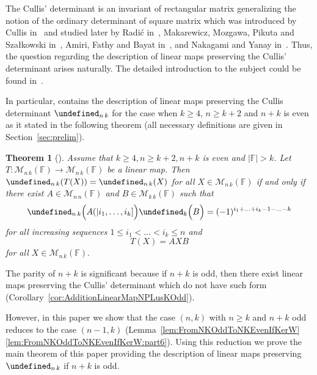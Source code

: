 \documentclass{elsarticle}
\def\F{{\mathbb F}}
\def\M{{\mathcal M}}
\let\det\undefined
\DeclareMathOperator{\det}{det}
\theoremstyle{plain}
\newtheorem{theorem}{Theorem}[section]
\theoremstyle{definition}
\numberwithin{equation}{section}
\begin{document}
The Cullis' determinant is an invariant of rectangular matrix generalizing the notion of the ordinary determinant of square matrix which was introduced by Cullis in~\cite{cullis1913} and studied later by Radi\'{c} in~\cite{radic1966,radic2005,radic1991,radic2008}, Makarewicz, Mozgawa, Pikuta and Sza\l{}kowski in~\cite{makarewicz2014,makarewicz2016,makarewicz2020}, Amiri, Fathy and Bayat in~\cite{amiri2010}, and Nakagami and Yanay in~\cite{NAKAGAMI2007422}. Thus, the question regarding the description of linear maps preserving the Cullis' determinant arises naturally. The detailed introduction to the subject could be found in~\cite{Guterman2025}. %

In particular, \cite{Guterman2025} contains the description of linear maps preserving the Cullis determinant $\det_{n\,k}$ for the case when $ k \ge 4$, $n \ge k + 2$ and $n + k$ is even as it stated in the following theorem (all necessary definitions are given in Section~\ref{sec:prelim}).

\begin{theorem}[{\cite[Theorem~5.14]{Guterman2025}}]\label{MainTheoremEvenIntro}Assume that $k \ge 4, n \ge k + 2, n + k$ is even and $|\F| > k$. Let $T\colon \M_{n\,k} (\F) \to \M_{n\,k} (\F)$ be a linear map. Then $\det_{n\,k} (T(X)) = \det_{n\,k}(X)$ for all $X \in \M_{n\,k} (\F)$ if and only if there exist $A \in \M_{n\,n}(\F)$ and $B \in \M_{k\,k}(\F)$ such that
\[
\det_{n\,k} \Bigl(A(|i_1,\ldots, i_k]\Bigr) \det_k \Bigl(B\Bigr) = (-1)^{i_1 + \ldots + i_k - 1 - \ldots - k}
\]
for all increasing sequences $1 \le i_1 < \ldots < i_k \le n $ and
\[
T(X) = AXB
\]
for all $X \in \M_{n\,k} (\F).$
\end{theorem}

The parity of $n + k$ is significant because if $n + k$ is odd, then there exist linear maps preserving the Cullis' determinant which do not have such form (Corollary~\ref{cor:AdditionLinearMapNPLusKOdd}). 

However, in this paper we show that the case $(n,k)$ with $n \ge k$ and $n + k$ odd reduces to the case $(n-1,k)$ (Lemma~\ref{lem:FromNKOddToNKEvenIfKerW}\ref{lem:FromNKOddToNKEvenIfKerW:part6}). Using this reduction we prove the main theorem of this paper providing the description of linear maps preserving $\det_{n\,k}$ if $n + k$ is odd.
\end{document}
